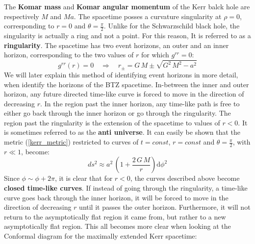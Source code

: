 The \textbf{Komar mass} and \textbf{Komar angular momentum} of the Kerr balck hole are respectively $M$ and $M a$. The spacetime posses a curvature singularity at $\rho=0$, corresponding to $r=0$ and $\theta = \frac{\pi}{2}$. Unlike for the Schwarzschild black hole, the singularity is actually a ring and not a point. For this reason, It is referred to as a \textbf{ringularity}. The spacetime has two event horizons, an outer and an inner horizon, corresponding to the two values of $r$ for which $g^{rr} = 0$:
%
%
\begin{equation}
g^{rr}(r) = 0
\quad \Rightarrow \quad
r_{\pm} = G \, M \pm \sqrt{G^2 \, M^2 - a^2}
\end{equation}
%
%
We will later explain this method of identifying event horizons in more detail, when identify the horizons of the BTZ spacetime. In-between the inner and outer horizon, any future directed time-like curve is forced to move in the direction of decreasing $r$. In the region past the inner horizon, any time-like path is free to either go back through the inner horizon or go through the ringularity. The region past the ringularity is the extension of the spacetime to values of $r < 0$. It is sometimes referred to as the \textbf{anti universe}. It can easily be shown that the metric (\ref{kerr_metric}) restricted to curves of $t=const$, $r=const$ and $\theta = \frac{\pi}{2}$, with $r \ll 1$, become:
%
%
\begin{equation}
ds^2 \approx a^2 \, \left( 1 + \frac{2 \, G \, M}{r} \right) \mathrm{d}\phi^2
\end{equation}
%
%
Since $\phi \sim \phi + 2 \pi$, it is clear that for $r < 0$, the curves described above become \textbf{closed time-like curves}. If instead of going through the ringularity, a time-like curve goes back through the inner horizon, it will be forced to move in the direction of decreasing $r$ until it passes the outer horizon. Furthermore, it will not return to the asymptotically flat region it came from, but rather to a new asymptotically flat region. This all becomes more clear when looking at the Conformal diagram for the maximally extended Kerr spacetime:
%
